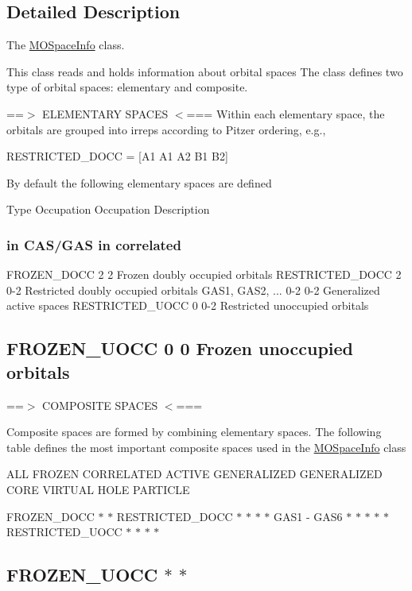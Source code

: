 \subsection{Detailed Description}
The \mbox{\hyperlink{classforte_1_1_m_o_space_info}{M\+O\+Space\+Info}} class. 

This class reads and holds information about orbital spaces The class defines two type of orbital spaces\+: elementary and composite.

==$>$ E\+L\+E\+M\+E\+N\+T\+A\+RY S\+P\+A\+C\+ES $<$=== Within each elementary space, the orbitals are grouped into irreps according to Pitzer ordering, e.\+g.,

R\+E\+S\+T\+R\+I\+C\+T\+E\+D\+\_\+\+D\+O\+CC = \mbox{[}A1 A1 A2 B1 B2\mbox{]}

By default the following elementary spaces are defined 

 Type Occupation Occupation Description \subsubsection*{in C\+A\+S/\+G\+AS in correlated }

F\+R\+O\+Z\+E\+N\+\_\+\+D\+O\+CC 2 2 Frozen doubly occupied orbitals R\+E\+S\+T\+R\+I\+C\+T\+E\+D\+\_\+\+D\+O\+CC 2 0-\/2 Restricted doubly occupied orbitals G\+A\+S1, G\+A\+S2, ... 0-\/2 0-\/2 Generalized active spaces R\+E\+S\+T\+R\+I\+C\+T\+E\+D\+\_\+\+U\+O\+CC 0 0-\/2 Restricted unoccupied orbitals \subsection*{F\+R\+O\+Z\+E\+N\+\_\+\+U\+O\+CC 0 0 Frozen unoccupied orbitals }

==$>$ C\+O\+M\+P\+O\+S\+I\+TE S\+P\+A\+C\+ES $<$===

Composite spaces are formed by combining elementary spaces. The following table defines the most important composite spaces used in the \mbox{\hyperlink{classforte_1_1_m_o_space_info}{M\+O\+Space\+Info}} class 

 A\+LL F\+R\+O\+Z\+EN C\+O\+R\+R\+E\+L\+A\+T\+ED A\+C\+T\+I\+VE G\+E\+N\+E\+R\+A\+L\+I\+Z\+ED G\+E\+N\+E\+R\+A\+L\+I\+Z\+ED C\+O\+RE V\+I\+R\+T\+U\+AL H\+O\+LE P\+A\+R\+T\+I\+C\+LE

F\+R\+O\+Z\+E\+N\+\_\+\+D\+O\+CC $\ast$ $\ast$ R\+E\+S\+T\+R\+I\+C\+T\+E\+D\+\_\+\+D\+O\+CC $\ast$ $\ast$ $\ast$ $\ast$ G\+A\+S1 -\/ G\+A\+S6 $\ast$ $\ast$ $\ast$ $\ast$ $\ast$ R\+E\+S\+T\+R\+I\+C\+T\+E\+D\+\_\+\+U\+O\+CC $\ast$ $\ast$ $\ast$ $\ast$ \subsection*{F\+R\+O\+Z\+E\+N\+\_\+\+U\+O\+CC $\ast$ $\ast$ }

